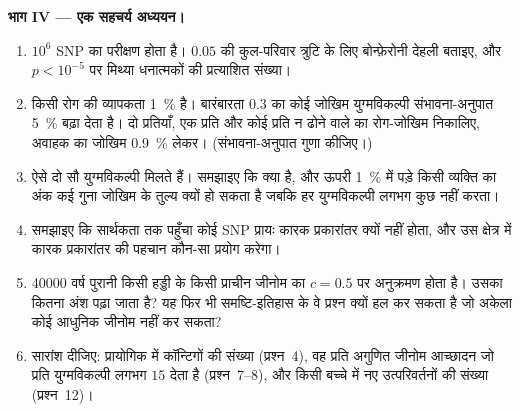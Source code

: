 \begin{problem}
\medskip
\noindent\textbf{भाग IV --- एक सहचर्य अध्ययन।}
\begin{enumerate}[resume]
  \item $10^{6}$ SNP का परीक्षण होता है। $0.05$ की कुल-परिवार त्रुटि के
        लिए बोन्फ़ेरोनी देहली बताइए, और $p < 10^{-5}$ पर मिथ्या
        धनात्मकों की प्रत्याशित संख्या।
  \item किसी रोग की व्यापकता \qty{1}{\%} है। बारंबारता $0.3$ का कोई
        जोखिम युग्मविकल्पी संभावना-अनुपात \qty{5}{\%} बढ़ा देता है। दो
        प्रतियाँ, एक प्रति और कोई प्रति न ढोने वाले का रोग-जोखिम
        निकालिए, अवाहक का जोखिम \qty{0.9}{\%} लेकर। (संभावना-अनुपात
        गुणा कीजिए।)
  \item ऐसे दो सौ युग्मविकल्पी मिलते हैं। समझाइए कि  क्या
        है, और ऊपरी \qty{1}{\%} में पड़े किसी व्यक्ति का अंक कई गुना
        जोखिम के तुल्य क्यों हो सकता है जबकि हर युग्मविकल्पी लगभग कुछ
        नहीं करता।
  \item समझाइए कि सार्थकता तक पहुँचा कोई SNP प्रायः कारक प्रकारांतर
        क्यों नहीं होता, और उस क्षेत्र में कारक प्रकारांतर की पहचान
        कौन-सा प्रयोग करेगा।
  \item \num{40000} वर्ष पुरानी किसी हड्डी के किसी प्राचीन जीनोम का
        $c = 0.5$ पर अनुक्रमण होता है। उसका कितना अंश पढ़ा जाता है?
        यह फिर भी समष्टि-इतिहास के वे प्रश्न क्यों हल कर सकता है जो
        अकेला कोई आधुनिक जीनोम नहीं कर सकता?
  \item सारांश दीजिए: प्रायोगिक  में कॉन्टिगों की संख्या
        (प्रश्न~4), वह प्रति अगुणित जीनोम आच्छादन जो प्रति
        युग्मविकल्पी लगभग $15$  देता है (प्रश्न~7--8), और किसी
        बच्चे में नए उत्परिवर्तनों की संख्या (प्रश्न~12)।
\end{enumerate}
\end{problem}
